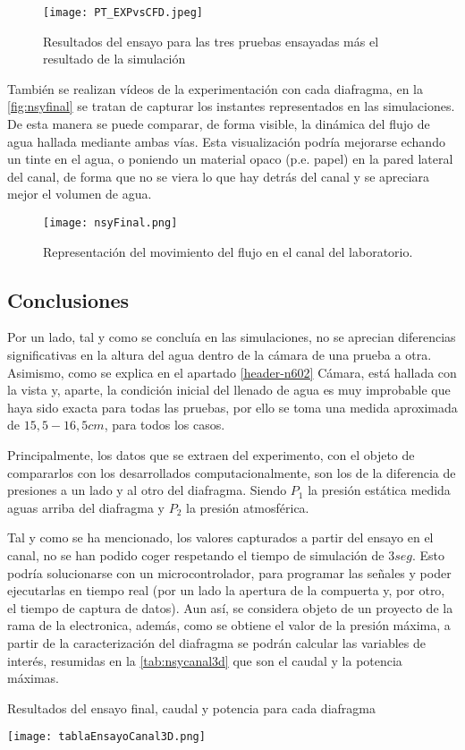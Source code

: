 \begin{figure}
\centering
\texttt{[image: PT\_EXPvsCFD.jpeg]}
\caption[Resultados del ensayo y simulación]{Resultados del ensayo para las tres pruebas ensayadas más el resultado de la simulación}
\label{fig:PT_EXPvsCFD}
\end{figure}

También se realizan vídeos de la experimentación con cada diafragma, en
la \autoref{fig:nsyfinal} se tratan de capturar los instantes representados en
las simulaciones. De esta manera se puede comparar, de forma visible, la
dinámica del flujo de agua hallada mediante ambas vías. Esta
visualización podría mejorarse echando un tinte en el agua, o poniendo
un material opaco (p.e. papel) en la pared lateral del canal, de forma
que no se viera lo que hay detrás del canal y se apreciara mejor el
volumen de agua.

\begin{figure}
\centering
\texttt{[image: nsyFinal.png]}
\caption{Representación del movimiento del flujo en el canal del laboratorio.}
\label{fig:nsyfinal}
\end{figure}

\subsection{Conclusiones}\label{header-n579}

Por un lado, tal y como se concluía en las simulaciones, no se aprecian
diferencias significativas en la altura del agua dentro de la cámara de
una prueba a otra. Asimismo, como se explica en el apartado 
\ref{header-n602} Cámara, está hallada con la vista y, aparte, la condición inicial del
llenado de agua es muy improbable que haya sido exacta para todas las
pruebas, por ello se toma una medida aproximada de \(15,5-16,5 cm\),
para todos los casos.

Principalmente, los datos que se extraen del experimento, con el objeto
de compararlos con los desarrollados computacionalmente, son los de la
diferencia de presiones a un lado y al otro del diafragma. Siendo
\(P_1\) la presión estática medida aguas arriba del diafragma y \(P_2\)
la presión atmosférica.

Tal y como se ha mencionado, los valores capturados a partir del ensayo
en el canal, no se han podido coger respetando el tiempo de simulación
de \(3seg\). Esto podría solucionarse con un microcontrolador, para
programar las señales y poder ejecutarlas en tiempo real (por un lado la
apertura de la compuerta y, por otro, el tiempo de captura de datos).
Aun así, se considera objeto de un proyecto de la rama de la
electronica, además, como se obtiene el valor de la presión máxima, a
partir de la caracterización del diafragma se podrán calcular las
variables de interés, resumidas en la \autoref{tab:nsycanal3d} que son el caudal y la potencia máximas.

\begin{table}[ht]
\centering
\caption[Caudal y potencia ensayo final]{Resultados del ensayo final, caudal y potencia para cada diafragma}
\texttt{[image: tablaEnsayoCanal3D.png]}
\label{tab:nsycanal3d}
\end{table}



